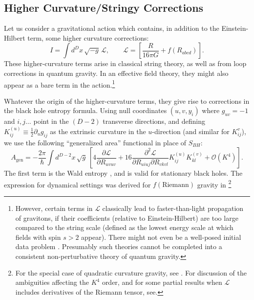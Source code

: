 \documentclass[12pt,a4paper]{article}
\def\be{\begin{equation}}
\def\ee{\end{equation}}
\begin{document}
\subsection{Higher Curvature/Stringy Corrections} \label{sec:stringcorrect}
Let us consider a gravitational action which contains, in addition to the Einstein-Hilbert term, some higher curvature corrections:
\be
I = \int d^D x \, \sqrt{-g} \, \mathcal{L}, \qquad \mathcal{L} = \left[ \frac{R}{16 \pi G} + f(R_{abcd}) \right].
\ee
These higher-curvature terms arise in classical string theory, 
as well as from loop corrections in quantum gravity.
 In an effective field theory, they might also appear as a bare term in the action.\footnote{However, certain terms in $\mathcal{L}$ classically lead to faster-than-light propagation of gravitons, if their coefficients (relative to Einstein-Hilbert) are too large compared to the string scale (defined as the lowest energy scale at which fields with spin $s>2$ appear)\cite{camanho2016causality,Papallo:2015rna}.  There might not even be a well-posed initial data problem \cite{Papallo:2017qvl,Reall:2014pwa,Reall:2014sla}.  Presumably such theories cannot be completed into a consistent non-perturbative theory of quantum gravity.}


Whatever the origin of the higher-curvature terms, they give rise to corrections in the black hole entropy formula. Using null coordinates $(u,v,y_i)$ where $g_{uv} = -1$ and $i,j \ldots$ point in the $(D-2)$ transverse directions, and defining $K_{ij}^{(u)} \equiv \tfrac{1}{2} \partial_u g_{ij}$ as the extrinsic curvature in the $u$-direction (and similar for $K_{ij}^{v}$), we use the following ``generalized area'' functional in place of $S_{BH}$:
\be \label{eq:SBH}
A_\mathrm{gen} = - \frac{2 \pi}{\hbar} \int d^{D-2} x \,\sqrt{g}\,\left[4 \frac{\partial \mathcal{L}}{\partial R_{uvuv}} + 16 \frac{\partial^2 \mathcal{L}}{\partial R_{uiuj} \partial R_{vkvl}} K_{ij}^{(u)} K_{kl}^{(v)} + \mathcal{O}(K^4)\right].
\ee
The first term is the Wald entropy \cite{wald1993black,JKM,Visser:1993nu,iyer1994some}, and is valid for stationary black holes. The expression for dynamical settings was derived for $f(\mathrm{Riemann})$ gravity in \cite{dong,Wall:2015raa}\footnote{For the special case of quadratic curvature gravity, see \cite{solodukhin2008entanglement,fursaev2013distributional,camps2014generalized}.  For discussion of the ambiguities affecting the $K^4$ order, and for some partial results when $\mathcal{L}$ includes derivatives of the Riemann tensor, see\cite{miao2015holographic,miao2015universal}.}
\end{document}
